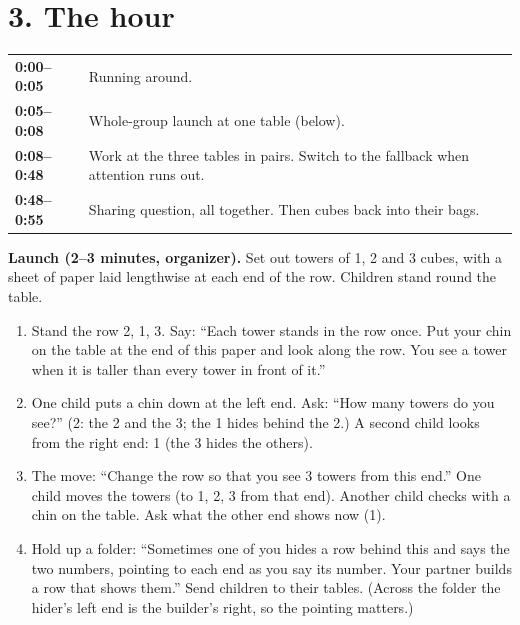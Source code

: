 \documentclass[11pt]{extarticle}
\begin{document}
\section{3. The hour}

\begin{tabularx}{\linewidth}{@{}>{\bfseries}l X@{}}
\toprule
0:00--0:05 & Running around. \\
0:05--0:08 & Whole-group launch at one table (below). \\
0:08--0:48 & Work at the three tables in pairs. Switch to the fallback when attention runs out. \\
0:48--0:55 & Sharing question, all together. Then cubes back into their bags. \\
\bottomrule
\end{tabularx}

\textbf{Launch (2--3 minutes, organizer).} Set out towers of 1, 2 and 3 cubes, with a sheet of paper laid lengthwise at each end of the row. Children stand round the table.
\begin{enumerate}
\item Stand the row 2, 1, 3. Say: ``Each tower stands in the row once. Put your chin on the table at the end of this paper and look along the row. You see a tower when it is taller than every tower in front of it.''
\item One child puts a chin down at the left end. Ask: ``How many towers do you see?'' (2: the 2 and the 3; the 1 hides behind the 2.) A second child looks from the right end: 1 (the 3 hides the others).
\item The move: ``Change the row so that you see 3 towers from this end.'' One child moves the towers (to 1, 2, 3 from that end). Another child checks with a chin on the table. Ask what the other end shows now (1).
\item Hold up a folder: ``Sometimes one of you hides a row behind this and says the two numbers, pointing to each end as you say its number. Your partner builds a row that shows them.'' Send children to their tables. (Across the folder the hider's left end is the builder's right, so the pointing matters.)
\end{enumerate}
\end{document}
